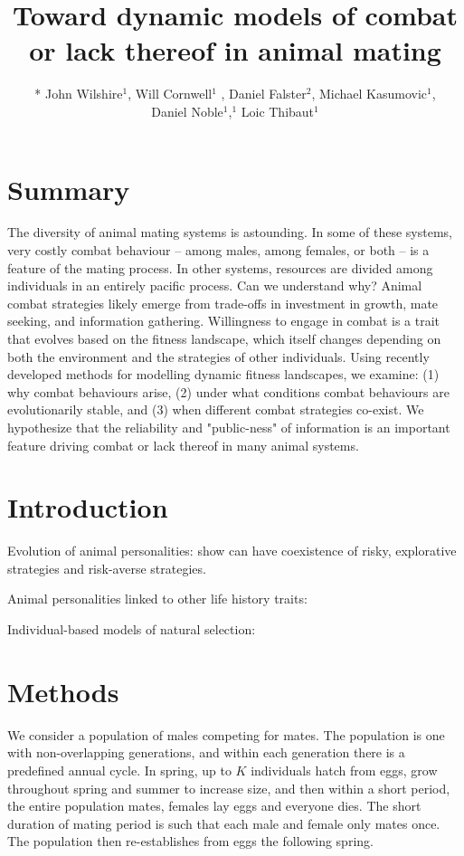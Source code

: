 \documentclass[a4paper,11pt]{article}
\title{Toward dynamic models of combat or lack thereof in animal mating}
\author{
* John Wilshire$^1$, Will Cornwell$^1$ , Daniel Falster$^2$, Michael Kasumovic$^1$, \\
Daniel Noble$^1$,$^1$ Loic Thibaut$^1$}
\affiliation{
*final list and order undecided\\
$^1$ University of NSW\\
$^2$ Macquarie University\\
}
\date{}
\begin{document}
\mstitlepage
\noindent

\section{Summary}
The diversity of animal mating systems is astounding. In some of these
systems, very costly combat behaviour -- among males, among females, or
both -- is a feature of the mating process.  In other systems, resources
are divided among individuals in an entirely pacific process.  Can we
understand why? Animal combat strategies likely emerge from trade-offs
in investment in growth, mate seeking, and information gathering.
Willingness to engage in combat is a trait that evolves based on the
fitness landscape, which itself changes depending on both the
environment and the strategies of other individuals.  Using recently
developed methods for modelling dynamic fitness landscapes, we examine:
(1) why combat behaviours arise, (2) under what conditions combat
behaviours are evolutionarily stable, and (3) when different combat
strategies co-exist.  We hypothesize that the reliability and
"public-ness" of information is an important feature driving combat or
lack thereof in many animal systems.

\section{Introduction}

Evolution of animal personalities: \citep{Wolf-2007,Wolf-2012} show can have
coexistence of risky, explorative strategies and risk-averse strategies.

Animal personalities linked to other life history traits: \citep{Biro-2008}

Individual-based models of natural selection: \citep{MGonigle-2012}


\section{Methods}


We consider a population of males competing for mates. The population is one with non-overlapping generations, and within each generation there is a predefined annual cycle. In spring, up to $K$ individuals hatch from eggs, grow throughout spring and summer to increase size, and then within a short period, the entire population mates, females lay eggs and everyone dies. The short duration of mating period is such that each male and female only mates once. The population then re-establishes from eggs the following spring.
\end{document}
